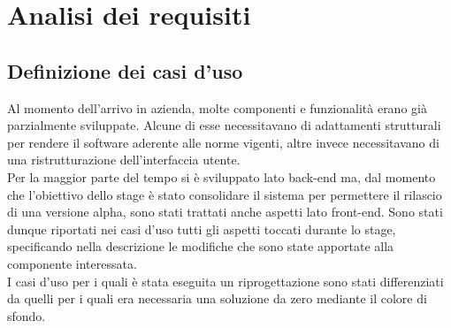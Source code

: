 \section{Analisi dei requisiti}

\subsection{Definizione dei casi d'uso}
	Al momento dell'arrivo in azienda, molte componenti e funzionalità erano già parzialmente sviluppate. Alcune di esse necessitavano di adattamenti strutturali per rendere il software aderente alle norme vigenti, altre invece necessitavano di una ristrutturazione dell'interfaccia utente. \\ 
	Per la maggior parte del tempo si è sviluppato lato back-end  ma, dal momento che l'obiettivo dello stage è stato consolidare il sistema per permettere il rilascio di una versione alpha, sono stati trattati anche aspetti lato front-end. 
	Sono stati dunque riportati nei casi d'uso tutti gli aspetti toccati durante lo stage,  specificando nella descrizione le modifiche che sono state apportate alla componente interessata. \\ 
	I casi  d'uso per i quali è stata eseguita un riprogettazione sono stati differenziati da quelli per i quali era necessaria una soluzione da zero mediante il colore di sfondo.
